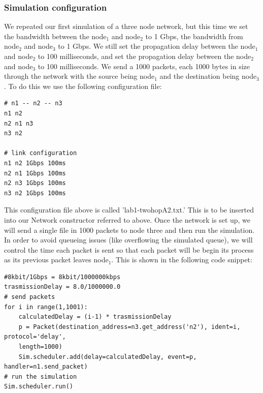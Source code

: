 \documentclass[fleqn,11pt]{article}
\begin{document}
\subsubsection{Simulation configuration}
We repeated our first simulation of a three node network, but this time we set the bandwidth between the node$_1$  and node$_2$  to 1 Gbps, the bandwidth from node$_2$  and node$_3$ to 1 Gbps. We still set the propagation delay between the node$_1$  and node$_2$ to 100 milliseconds, and set the propagation delay between the node$_2$  and node$_3$ to 100 milliseconds. We send a 1000 packets, each 1000 bytes in size through the network with the source being node$_1$ and the destination being node$_3$. To do this we use the following configuration file:
\begin{lstlisting}
# n1 -- n2 -- n3
n1 n2
n2 n1 n3
n3 n2

# link configuration
n1 n2 1Gbps 100ms
n2 n1 1Gbps 100ms
n2 n3 1Gbps 100ms
n3 n2 1Gbps 100ms
\end{lstlisting}
This configuration file above is called 'lab1-twohopA2.txt.' This is to be inserted into our Network constructor referred to above.
Once the network is set up, we will send a single file in 1000 packets to node three and then run the simulation. In order to avoid queueing issues (like overflowing the simulated queue), we will control the time each packet is sent so that each packet will be begin its process as its previous packet leaves node$_1$. This is shown in the following code snippet:    

\begin{lstlisting}
#8kbit/1Gbps = 8kbit/1000000kbps
trasmissionDelay = 8.0/1000000.0 
# send packets
for i in range(1,1001):
    calculatedDelay = (i-1) * trasmissionDelay
    p = Packet(destination_address=n3.get_address('n2'), ident=i, protocol='delay', 
	length=1000)
    Sim.scheduler.add(delay=calculatedDelay, event=p, handler=n1.send_packet)
# run the simulation
Sim.scheduler.run() 
\end{lstlisting}
\end{document}

